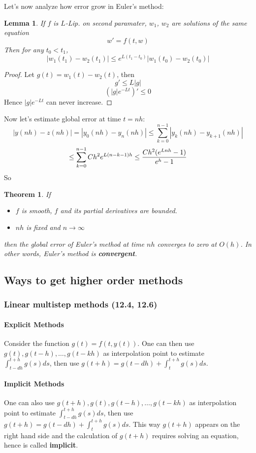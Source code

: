 \documentclass[20pt]{article} %
\theoremstyle{break}
\newtheorem{lem}[definition]{Lemma}
\newtheorem{thm}[definition]{Theorem}
\begin{document}
\newpage

Let's now analyze how error grow in Euler's method:

\begin{lem}
If $f$ is $L$-Lip. on second paramater, $w_1$, $w_2$ are solutions of the same equation
\[w'=f(t, w)\]
Then for any $t_0<t_1$,
\[|w_1(t_1)-w_2(t_1)|\leq e^{L(t_1-t_0)}|w_1(t_0)-w_2(t_0)|\]
\end{lem}

\begin{proof}
  Let $g(t)=w_1(t)-w_2(t)$, then
  \[g'\leq L|g|\]
  \[(|g|e^{-Lt})'\leq 0\]
  Hence $|g|e^{-Lt}$ can never increase.
\end{proof}

\newpage


Now let's estimate global error at time $t=nh$:
\[|y(nh)-z(nh)|=|y_0(nh)-y_n(nh)|\leq \sum_{k=0}^{n-1}|y_k(nh)-y_{k+1}(nh)|\]
\[\leq \sum_{k=0}^{n-1}Ch^2 e^{L(n-k-1)h}\leq {Ch^2(e^{Lnh}-1)\over e^h-1}\]
So
\begin{thm}
If
\begin{itemize}
\item $f$ is smooth, $f$ and its partial derivatives are bounded.
\item $nh$ is fixed and $n\rightarrow\infty$
\end{itemize}
then the global error of Euler's method at time $nh$ converges to zero at $O(h)$. In other words, Euler's method is {\bf convergent}.
\end{thm}

\newpage

\subsection{Ways to get higher order methods}

\subsubsection{Linear multistep methods (12.4, 12.6)}

\paragraph{Explicit Methods} Consider the function $g(t)=f(t, y(t))$. One can then use $g(t), g(t-h), \dots, g(t-kh)$ as interpolation point to estimate $\int_{t-dh}^{t+h}g(s)ds$, then use $g(t+h)=g(t-dh)+\int_t^{t+h}g(s)ds$.

\paragraph{Implicit Methods} One can also use $g(t+h), g(t), g(t-h), \dots, g(t-kh)$ as interpolation point to estimate $\int_{t-dh}^{t+h}g(s)ds$, then use $g(t+h)=g(t-dh)+\int_t^{t+h}g(s)ds$. This way $g(t+h)$ appears on the right hand side and the calculation of $g(t+h)$ requires solving an equation, hence is called {\bf implicit}.
\end{document}
